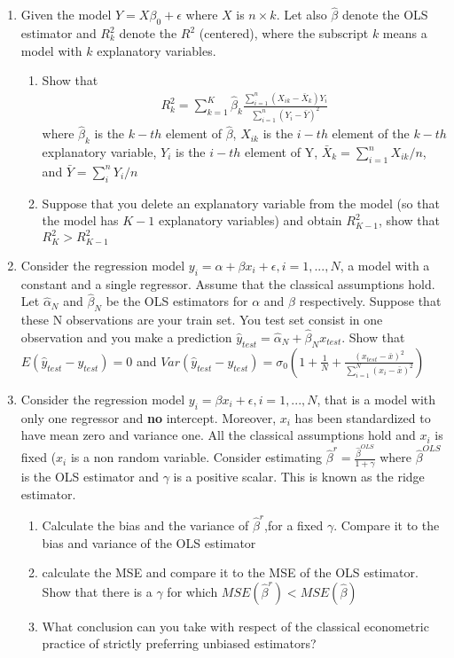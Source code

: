 \documentclass[12pt,onecolumn]{article}
\begin{document}
\begin{enumerate}
  \item Given the model $Y = X \beta_0 + \epsilon$ where $X$ is $n \times k$. Let also $\hat \beta$ denote the OLS estimator and $R^2_k$ denote the  $R^2$ (centered), where the subscript $k$ means a model with $k$ explanatory variables.
  \begin{enumerate}
    \item Show that 
    \begin{align}
      R^2_k = \sum_{k=1}^K \hat \beta_k \frac{\sum_{i=1}^n (X_{ik}-\bar{X}_k)Y_i}{\sum_{i=1}^n (Y_i-\bar Y)^2}
    \end{align}
    where $\hat \beta_k$ is the $k-th$ element of $\hat \beta$, $X_{ik}$ is the $i-th$ element of the $k-th$ explanatory variable, $Y_i$ is the $i-th$ element of Y, $\bar X_k = \sum_{i=1}^n X_{ik}/n$, and $\bar Y = \sum_i^n Y_i/n$
    \item Suppose that you delete an explanatory variable from the model (so that the model has $K-1$ explanatory variables) and obtain $R^2_{K-1}$, show that $R^2_{K}>R^2_{K-1}$
  \end{enumerate}
        
  \item Consider the regression model $y_i = \alpha +\beta x_i +\epsilon, i=1,...,N$, a model with a constant and a single regressor. Assume that the classical assumptions hold. Let $\hat \alpha_N$ and $\hat \beta_N$ be the OLS estimators for $\alpha$ and $\beta$ respectively. Suppose that these N observations are your train set. You test set consist in one observation and you make a prediction $\hat y_{test}=\hat \alpha_N + \hat \beta_N x_{test}$. Show that $E(\hat y_{test}-y_{test})=0$ and $Var(\hat y_{test}-y_{test})=\sigma_0 \left( 1+\frac{1}{N}+\frac{(x_{test}-\bar x)^2}{\sum_{i=1}^N (x_i-\bar x)^2 }\right)$
  
  
  
  
  \item Consider the regression model $y_i =  \beta x_i +\epsilon, i=1,...,N$, that is a model with only one regressor and {\bf no} intercept. Moreover, $x_i$ has been standardized to have mean zero and variance one. All the classical assumptions hold and $x_i$ is fixed ($x_i$ is a non random variable. Consider estimating $\hat \beta^r= \frac{\hat \beta^{OLS}}{1+\gamma}$ where $\hat \beta^{OLS}$ is the OLS estimator and $\gamma$ is a positive scalar. This is known as the ridge estimator.
  \begin{enumerate}
	  \item Calculate the bias and the variance of $\hat \beta^r$,for a fixed $\gamma$. Compare it to the bias and variance of the OLS estimator
	  \item calculate the MSE and compare it to the MSE of the OLS estimator. Show that there is a $\gamma$ for which $MSE(\hat \beta^r)<MSE(\hat \beta)$
	  \item What conclusion can you take with respect of the classical econometric practice of strictly preferring unbiased estimators?
\end{enumerate}
  
  

\end{enumerate}
\end{document}
